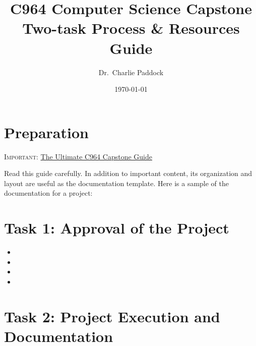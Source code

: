 \documentclass[11pt]{exam}
\title{%
  C964 Computer Science Capstone \\
  \large Two-task Process \& Resources Guide}
\author{Dr.\ Charlie Paddock}
\date{\today}
\begin{document}
\maketitle

\section*{Preparation}
\textsc{Important:} \textbf{\color{red}{Download}} \href{https://web5.wgu.edu/aap/content/the\%20ultimate\%20c964\%20capstone\%20guide\%20v2.pdf}{The Ultimate C964 Capstone Guide}

Read this guide carefully. In addition to important content, its organization and layout are useful as the documentation template. Here is a sample of the documentation for a project:

\section*{Task 1: Approval of the Project}
\begin{itemize}[leftmargin=2cm]
    \item[\textbf{Step 1.}] 
    \item[\textbf{Step 2.}] 
    \item[\textbf{Step 3.}] 
    \item[\textbf{Step 4.}] 
\end{itemize}

\section*{Task 2: Project Execution and Documentation}

\thispagestyle{empty}
\end{document}
